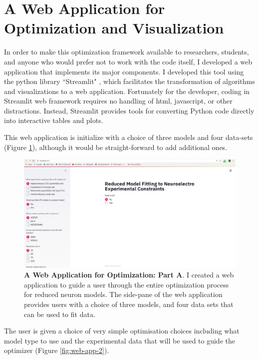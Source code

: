 \section{A Web Application for Optimization and Visualization}
\label{sec:web-app}
In order to make this optimization framework available to researchers, students, and anyone who would prefer not to work with the code itself, I developed a web application that implements its major components.
I developed this tool using the python library ``Streamlit" \citep{streamlit}, which facilitates the transformation of algorithms and visualizations to a web application.
Fortunately for the developer, coding in Streamlit web framework requires no handling of html, javascript, or other distractions.
Instead, Streamlit provides tools for converting Python code directly into interactive tables and plots.

This web application is initialize with a choice of three models and four data-sets (Figure \ref{fig:web-app-1}), although it would be straight-forward to add additional ones.

\begin{figure}
\begin{center}
\includegraphics[scale=1]{chapters/app_tex/web_app_thesis}
\end{center}
\caption[Web application (1)]{\textbf{A Web Application for Optimization: Part A}.
I created a web application to guide a user through the entire optimization process for reduced neuron models.
The side-pane of the web application provides users with a choice of three models, and four data sets that can be used to fit data.
}
\label{fig:web-app-1}
\end{figure}

The user is given a choice of very simple optimisation choices including what model type to use and the experimental data that will be used to guide the optimizer (Figure \ref{fig:web-app-2}).

